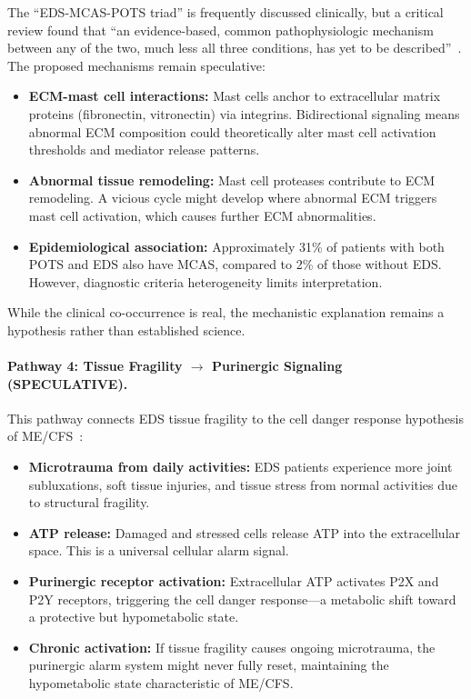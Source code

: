The ``EDS-MCAS-POTS triad'' is frequently discussed clinically, but a critical review found that ``an evidence-based, common pathophysiologic mechanism between any of the two, much less all three conditions, has yet to be described''~\cite{Kucharik2020}. The proposed mechanisms remain speculative:

\begin{itemize}
    \item \textbf{ECM-mast cell interactions:} Mast cells anchor to extracellular matrix proteins (fibronectin, vitronectin) via integrins. Bidirectional signaling means abnormal ECM composition could theoretically alter mast cell activation thresholds and mediator release patterns.

    \item \textbf{Abnormal tissue remodeling:} Mast cell proteases contribute to ECM remodeling. A vicious cycle might develop where abnormal ECM triggers mast cell activation, which causes further ECM abnormalities.

    \item \textbf{Epidemiological association:} Approximately 31\% of patients with both POTS and EDS also have MCAS, compared to 2\% of those without EDS. However, diagnostic criteria heterogeneity limits interpretation.
\end{itemize}

While the clinical co-occurrence is real, the mechanistic explanation remains a hypothesis rather than established science.

\paragraph{Pathway 4: Tissue Fragility $\rightarrow$ Purinergic Signaling (SPECULATIVE).}

This pathway connects EDS tissue fragility to the cell danger response hypothesis of ME/CFS~\cite{Naviaux2014cdr}:

\begin{itemize}
    \item \textbf{Microtrauma from daily activities:} EDS patients experience more joint subluxations, soft tissue injuries, and tissue stress from normal activities due to structural fragility.

    \item \textbf{ATP release:} Damaged and stressed cells release ATP into the extracellular space. This is a universal cellular alarm signal.

    \item \textbf{Purinergic receptor activation:} Extracellular ATP activates P2X and P2Y receptors, triggering the cell danger response---a metabolic shift toward a protective but hypometabolic state.

    \item \textbf{Chronic activation:} If tissue fragility causes ongoing microtrauma, the purinergic alarm system might never fully reset, maintaining the hypometabolic state characteristic of ME/CFS.
\end{itemize}

